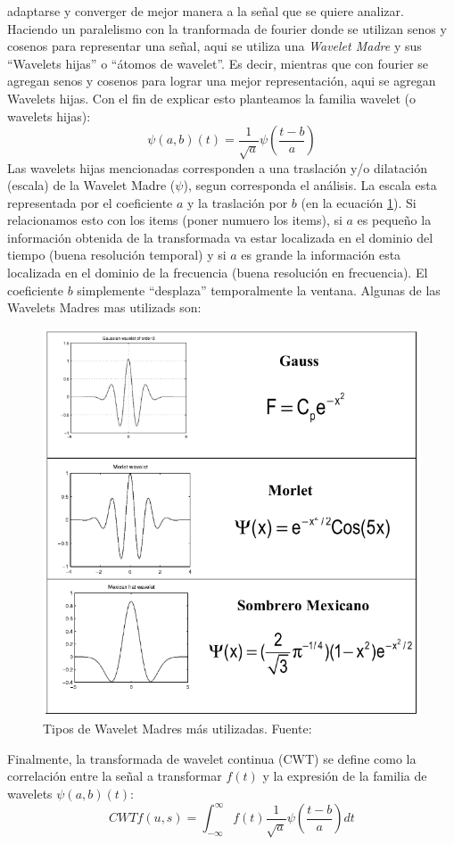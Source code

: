 \documentclass{article}
\begin{document}
adaptarse y converger de mejor manera a la señal que se quiere analizar. Haciendo un paralelismo con la tranformada de fourier donde se utilizan senos y cosenos para representar una señal, aqui se utiliza una \textit{Wavelet Madre} y sus ``Wavelets hijas'' o ``átomos de wavelet''. Es decir, mientras que con fourier se agregan senos y cosenos para lograr 
una mejor representación, aqui se agregan Wavelets hijas. Con el fin de explicar esto planteamos la familia wavelet (o wavelets hijas):
\begin{equation}
    \label{WM}
    \psi(a,b)(t)= \frac{1}{\sqrt{a}} \psi(\frac{t-b}{a})
\end{equation}
Las wavelets hijas mencionadas corresponden a una traslación y/o dilatación (escala) de la Wavelet Madre ($\psi$), segun corresponda el análisis. La escala esta representada por el coeficiente $a$ y la traslación por $b$ (en la ecuación \ref{WM}). Si relacionamos esto con los items (poner numuero los items), si $a$ es pequeño la información obtenida de la transformada va estar localizada en el dominio del tiempo (buena resolución temporal) y si 
$a$ es grande la información esta localizada en el dominio de la frecuencia (buena resolución en frecuencia). El coeficiente $b$ simplemente ``desplaza'' temporalmente la ventana. Algunas de las Wavelets Madres mas utilizads son:
\begin{figure}[H]
    \centering
    \includegraphics[scale=0.5]{Fig/7}
    \caption{Tipos de Wavelet Madres más utilizadas. Fuente:}
    \label{WM}
\end{figure}
Finalmente, la transformada de wavelet continua (CWT) se define como la correlación entre la señal a transformar $f(t)$ y la expresión de la familia de wavelets $\psi(a,b)(t)$:
\begin{equation}
    CWT f(u,s)= \int_{-\infty}^{\infty} f(t) \frac{1}{\sqrt{a}} \psi(\frac{t-b}{a})dt
\end{equation}
\end{document}
